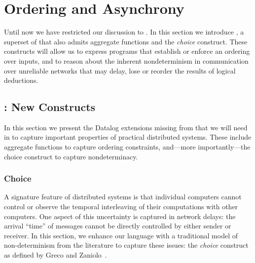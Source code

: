 \section{Ordering and Asynchrony}
\label{sec:async}

%    

Until now we have restricted our discussion to \slang.  In this section we
introduce \lang, a superset of \slang that also admits aggregate functions
and the \emph{choice} construct.  These constructs will allow us to
express programs that establish or enforce an ordering over inputs, and to
reason about the inherent nondeterminism in communication over unreliable
networks that may delay, lose or reorder the results of logical deductions. 

\subsection{{\bf \large \lang}: New Constructs}

In this section we present the Datalog extensions missing from \slang that we will need in \lang to capture important properties of practical distributed systems.  These include aggregate functions to 
capture ordering constraints, and---more importantly---the choice construct to capture nondeterminacy.





\subsubsection{Choice}
A signature feature of distributed systems is that individual computers cannot control or observe the temporal interleaving of their computations with other computers.  One aspect of this uncertainty is captured in network delays: the arrival ``time'' of messages cannot be directly controlled by either sender or receiver.  In this section, we enhance our language with a traditional model of non-determinism from the literature to capture these issues: the \emph{choice} construct as defined by Greco and Zaniolo~\cite{greedychoice}.

